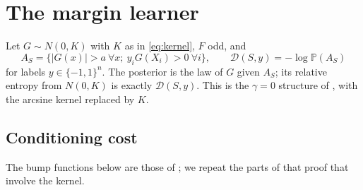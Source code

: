 \documentclass[11pt]{article}
\theoremstyle{definition}\newtheorem{assumption}[theorem]{Assumption}
\theoremstyle{remark}\newtheorem{remark}[theorem]{Remark}
\newcommand{\Pp}{\mathbb P}
\begin{document}
\section{The margin learner}\label{sec:margin}
Let $G\sim N(0,K)$ with $K$ as in \eqref{eq:kernel}, $F$ odd, and
\[
 A_S=\{|G(x)|>a\ \forall x;\ y_iG(X_i)>0\ \forall i\},\qquad
 \mathcal D(S,y)=-\log\Pp(A_S)
\]
for labels $y\in\{-1,1\}^n$. The posterior is the law of $G$ given $A_S$;
its relative entropy from $N(0,K)$ is exactly $\mathcal D(S,y)$. This is the
$\gamma=0$ structure of \cite[Section~7]{subcritical}, with the arcsine
kernel replaced by $K$.

\subsection{Conditioning cost}
The bump functions below are those of \cite[Lemma~7.2]{subcritical}; we
repeat the parts of that proof that involve the kernel.
\end{document}
